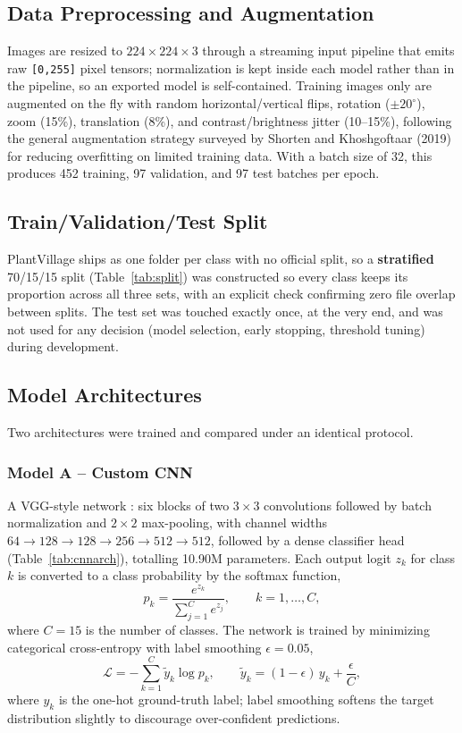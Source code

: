 \documentclass[12pt,a4paper]{article}
\begin{document}
\subsection{Data Preprocessing and Augmentation}
Images are resized to $224\times224\times3$ through a streaming input
pipeline that emits raw \texttt{[0,255]} pixel tensors; normalization is kept
inside each model rather than in the pipeline, so an exported model is
self-contained. Training images only are augmented on the fly with random
horizontal/vertical flips, rotation ($\pm20^{\circ}$), zoom (15\%),
translation (8\%), and contrast/brightness jitter (10--15\%), following the
general augmentation strategy surveyed by Shorten and Khoshgoftaar (2019)
\cite{shorten2019augmentation} for reducing overfitting on limited training
data. With a batch size of 32, this produces 452 training, 97 validation, and
97 test batches per epoch.

\subsection{Train/Validation/Test Split}
PlantVillage ships as one folder per class with no official split, so a
\textbf{stratified} 70/15/15 split (Table~\ref{tab:split}) was constructed so
every class keeps its proportion across all three sets, with an explicit
check confirming zero file overlap between splits. The test set was touched
exactly once, at the very end, and was not used for any decision (model
selection, early stopping, threshold tuning) during development.

\subsection{Model Architectures}
Two architectures were trained and compared under an identical protocol.

\subsubsection{Model A -- Custom CNN}
A VGG-style network \cite{simonyan2015}: six blocks of two $3\times3$
convolutions followed by batch normalization and $2\times2$ max-pooling, with
channel widths $64{\to}128{\to}128{\to}256{\to}512{\to}512$, followed by a
dense classifier head (Table~\ref{tab:cnnarch}), totalling 10.90M parameters.
Each output logit $z_k$ for class $k$ is converted to a class probability by
the softmax function,
\begin{equation}
p_k = \frac{e^{z_k}}{\sum_{j=1}^{C} e^{z_j}}, \qquad k = 1,\dots,C,
\label{eq:softmax}
\end{equation}
where $C=15$ is the number of classes. The network is trained by minimizing
categorical cross-entropy with label smoothing $\epsilon=0.05$,
\begin{equation}
\mathcal{L} = -\sum_{k=1}^{C} \tilde{y}_k \log p_k, \qquad
\tilde{y}_k = (1-\epsilon)\,y_k + \frac{\epsilon}{C},
\label{eq:ce}
\end{equation}
where $y_k$ is the one-hot ground-truth label; label smoothing softens the
target distribution slightly to discourage over-confident predictions.
\end{document}
